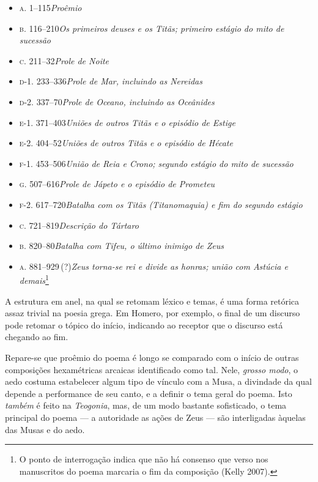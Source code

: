 \begin{itemize}
\item \textsc{a.} 1--115\quad \textit{Proêmio}
\item \textsc{b.} 116--210\quad \textit{Os primeiros deuses e os Titãs; primeiro estágio do mito de sucessão}
\item \textsc{c.} 211--32\quad \textit{Prole de Noite}
\item \textsc{d-1.} 233--336\quad \textit{Prole de Mar, incluindo as Nereidas}
\item \textsc{d-2.} 337--70\quad \textit{Prole de Oceano, incluindo as Oceânides}
\item \textsc{e-1.} 371--403\quad \textit{Uniões de outros Titãs e o episódio de Estige}
\item \textsc{e-2.} 404--52\quad \textit{Uniões de outros Titãs e o episódio de Hécate}
\item \textsc{f-1.} 453--506\quad \textit{União de Reia e Crono; segundo estágio do mito de sucessão}
\item \textsc{g.} 507--616\quad \textit{Prole de Jápeto e o episódio de Prometeu}
\item \textsc{f-2.} 617--720\quad \textit{Batalha com os Titãs (Titanomaquia) e fim do segundo estágio}
\item \textsc{c.} 721--819\quad \textit{Descrição do Tártaro}
\item \textsc{b.} 820--80\quad \textit{Batalha com Tifeu, o último inimigo de Zeus}
\item \textsc{a.} 881--929\,(?)\quad \textit{Zeus torna-se rei e divide as honras; união com Astúcia e demais}\footnote{O ponto de interrogação indica que não há consenso que verso nos manuscritos do poema marcaria o fim da composição (Kelly 2007).} 
\end{itemize}

A estrutura em anel, na qual se retomam léxico e temas, é uma forma
retórica assaz trivial na poesia grega. Em Homero, por exemplo, o final
de um discurso pode retomar o tópico do início, indicando ao receptor
que o discurso está chegando ao fim.

Repare-se que proêmio do poema é longo se comparado com o início de
outras composições hexamétricas arcaicas identificado como tal. Nele,
\textit{grosso modo}, o aedo costuma estabelecer algum tipo de vínculo com
a Musa, a divindade da qual depende a performance de seu canto, e a
definir o tema geral do poema. Isto \textit{também} é feito na
\textit{Teogonia}, mas, de um modo bastante sofisticado, o tema principal
do poema --- a autoridade as ações de Zeus --- são interligadas àquelas
das Musas e do aedo.

